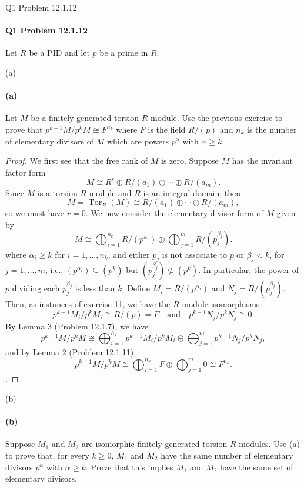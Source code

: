 \documentclass[12pt]{article}
\newenvironment{fullbox}{\begin{lrbox}{\savefullbox}\begin{minipage}{\dimexpr\textwidth-2\fboxsep\relax}}{\end{minipage}\end{lrbox}\begin{center}\framebox[\textwidth]{\usebox{\savefullbox}}\end{center}}
\newenvironment{pbox}[1][]{\begin{fullbox}\ifx#1\empty\else\paragraph{#1}\fi}{\end{fullbox}}
\theoremstyle{definition}
\newcommand{\isp}[1]{\quad\text{#1}\quad}
\newcommand{\isom}{\cong}
\newcommand{\dsum}{\oplus}
\newcommand{\Dsum}{\bigoplus}
\DeclareMathOperator{\Tor}{Tor}
\begin{document}
\begin{pbox}[Q1 Problem 12.1.12]
    Let $R$ be a PID and let $p$ be a prime in $R$.
\end{pbox}

\begin{pbox}[(a)]
    Let $M$ be a finitely generated torsion $R$-module. Use the previous exercise to prove that $p^{k-1}M/p^kM \isom F^{n_k}$ where $F$ is the field $R/(p)$ and $n_k$ is the number of elementary divisors of $M$ which are powers $p^\alpha$ with $\alpha \geq k$.
\end{pbox}

\begin{proof}
    We first see that the free rank of $M$ is zero. Suppose $M$ has the invariant factor form
    \[
        M \isom R^r \dsum R/(a_1) \dsum \cdots \dsum R/(a_m).
    \]
    Since $M$ is a torsion $R$-module and $R$ is an integral domain, then
    \[
        M = \Tor_R(M) \isom R/(a_1) \dsum \cdots \dsum R/(a_m),
    \]
    so we must have $r = 0$. We now consider the elementary divisor form of $M$ given by
    \[
        M \isom \Dsum_{i=1}^{n_k} R/(p^{\alpha_i}) \dsum \Dsum_{j=1}^{m} R/(p_j^{\beta_j}).
    \]
    where $\alpha_i \geq k$ for $i = 1, \dots, n_k$, and either $p_j$ is not associate to $p$ or $\beta_j < k$, for $j = 1, \dots, m$, i.e., $(p^{\alpha_i}) \subseteq (p^k)$ but $(p_j^{\beta_j}) \not\subseteq (p^k)$. In particular, the power of $p$ dividing each $p_j^{\beta_j}$ is less than $k$. Define $M_i = R/(p^{\alpha_i})$ and $N_j = R/(p_j^{\beta_j})$. Then, as instances of exercise 11, we have the $R$-module isomorphisms
    \[
        p^{k-1}M_i/p^kM_i \isom R/(p) = F
        \isp{and}
        p^{k-1}N_j/p^kN_j \isom 0.
    \]
    By Lemma 3 (Problem 12.1.7), we have
    \[
        p^{k-1}M/p^kM \isom \Dsum_{i=1}^{n_k} p^{k-1}M_i/p^kM_i \dsum \Dsum_{j=1}^{m} p^{k-1}N_j/p^kN_j,
    \]
    and by Lemma 2 (Problem 12.1.11),
    \[
        p^{k-1}M/p^kM
            \isom \Dsum_{i=1}^{n_k} F \dsum \Dsum_{j=1}^{m} 0
            \isom F^{n_k}.
    \].
    
\end{proof}

\newpage
\begin{pbox}[(b)]
    Suppose $M_1$ and $M_2$ are isomorphic finitely generated torsion $R$-modules. Use (a) to prove that, for every $k \geq 0$, $M_1$ and $M_2$ have the same number of elementary divisors $p^\alpha$ with $\alpha \geq k$. Prove that this implies $M_1$ and $M_2$ have the same set of elementary divisors.
\end{pbox}
\end{document}
